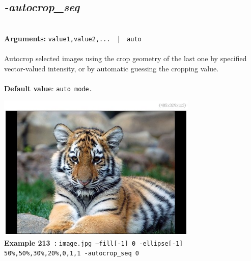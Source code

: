 \documentclass[a4paper,11pt,twoside]{book}
\begin{document}
\subsection{\emph{-autocrop\_seq} }\vspace*{-0.5em}
~\\\textbf{Arguments: } 
{\small \texttt{value1,value2,... ~$|$~ auto}}\\~\\
Autocrop selected images using the crop geometry of the last one by specified vector-valued intensity,
or by automatic guessing the cropping value.
~\\~\\\textbf{Default value}: {\small \texttt{auto mode.}}
\begin{center}\includegraphics[keepaspectratio=true,height=7cm,width=\textwidth]{img/gmic_def213.jpg}\\
{\footnotesize \textbf{Example 213~:} \texttt{image.jpg --fill[-1] 0 -ellipse[-1] 50\%,50\%,30\%,20\%,0,1,1 -autocrop\_seq 0}}
\end{center}
\end{document}
